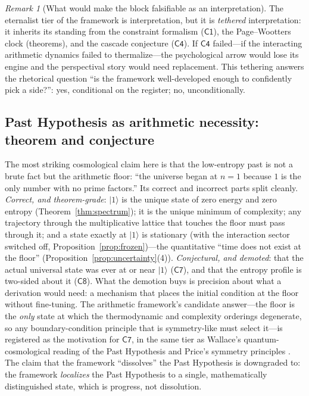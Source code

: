 \documentclass[11pt,a4paper]{article}
\theoremstyle{plain}
\theoremstyle{definition}
\theoremstyle{remark}
\newtheorem{remark}[theorem]{Remark}
\newcommand{\ket}[1]{\lvert #1\rangle}
\begin{document}
\begin{remark}[What would make the block falsifiable as an interpretation]
The eternalist tier of the framework is interpretation, but it is \emph{tethered}
interpretation: it inherits its standing from the constraint formalism
($\mathsf{C1}$), the Page--Wootters clock (theorems), and the cascade conjecture
($\mathsf{C4}$). If $\mathsf{C4}$ failed---if the interacting arithmetic dynamics failed to
thermalize---the psychological arrow would lose its engine and the perspectival story would
need replacement. This tethering answers the rhetorical question ``is the
framework well-developed enough to confidently pick a side?'': yes, conditional on the
register; no, unconditionally.
\end{remark}

\subsection{Past Hypothesis as arithmetic necessity: theorem and conjecture}

The most striking cosmological claim here is that the low-entropy past is not a brute
fact but the arithmetic floor: ``the universe began at $n=1$ because $1$ is the only number
with no prime factors.'' Its correct and incorrect parts split cleanly.
\emph{Correct, and theorem-grade}: $\ket{1}$ is the unique state of zero energy and
zero entropy (Theorem~\ref{thm:spectrum}); it is the unique minimum of complexity; any
trajectory through the multiplicative lattice that touches the floor must pass through it;
and a state exactly at $\ket{1}$ is stationary (with the interaction sector switched off,
Proposition~\ref{prop:frozen})---the quantitative ``time does not exist at the floor''
(Proposition~\ref{prop:uncertainty}(4)). \emph{Conjectural, and demoted}: that the actual
universal state was ever at or near $\ket{1}$ ($\mathsf{C7}$), and that the entropy profile
is two-sided about it ($\mathsf{C8}$). What the demotion buys is precision about what a
derivation would need: a mechanism that places the initial condition at the floor without
fine-tuning. The arithmetic framework's candidate answer---the floor is the \emph{only}
state at which the thermodynamic and complexity orderings degenerate, so any
boundary-condition principle that is symmetry-like must select it---is registered as the
motivation for $\mathsf{C7}$, in the same tier as Wallace's quantum-cosmological
reading of the Past Hypothesis \cite{wallace2017} and Price's symmetry principles
\cite{price1996}. The claim that the framework ``dissolves'' the Past Hypothesis
is downgraded to: the framework \emph{localizes} the Past Hypothesis to a single,
mathematically distinguished state, which is progress, not dissolution.
\end{document}
